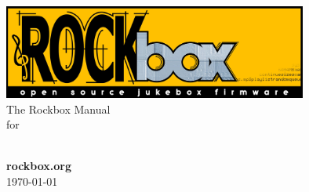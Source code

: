 \thispagestyle{empty}
\vspace*{0.3cm}
\begin{center}
\includegraphics[width=10cm]{frontpage/rockbox3540.jpg}\\
\vspace{2cm}
\huge{The Rockbox Manual\\for\\\playername}\vspace{1cm}\\

\vspace{\fill}

\large \textbf{rockbox.org}\ \\\today


\end{center}

\pagebreak
\thispagestyle{empty}
\cleardoublepage
